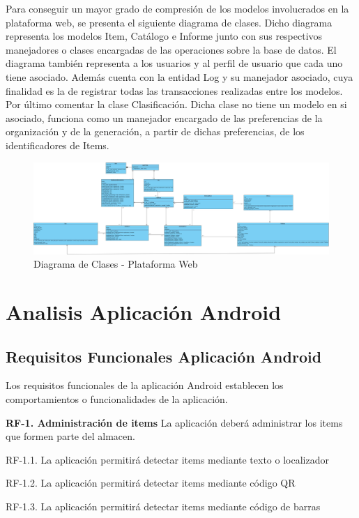 \documentclass[a4paper,11pt]{book}
\begin{document}
Para conseguir un mayor grado de compresión de los modelos involucrados en la plataforma web, se presenta el siguiente diagrama de clases. Dicho diagrama representa los modelos Item, Catálogo e Informe junto con sus respectivos manejadores o clases encargadas de las operaciones sobre la base de datos. El diagrama también representa a los usuarios y al perfil de usuario que cada uno tiene asociado.  Además cuenta con la entidad Log y su manejador asociado, cuya finalidad es la de registrar todas las transacciones realizadas entre los modelos. Por último comentar la clase Clasificación. Dicha clase no tiene un modelo en si asociado, funciona como un manejador encargado de las preferencias de la organización y de la generación, a partir de dichas preferencias, de los identificadores de Items. 

\begin{figure}[H] 
\centering 
\includegraphics[scale=0.15]{imagenes/clases/NoInventory_clases_web.jpg}
\caption{ Diagrama de Clases - Plataforma Web\cite{propio}  }  
\end{figure}


\section{Analisis Aplicación Android}

\subsection{Requisitos Funcionales Aplicación Android}
Los requisitos funcionales de la aplicación Android establecen los comportamientos o funcionalidades de la aplicación.

\textbf{RF-1. Administración de items} La aplicación deberá administrar los items que formen parte del almacen.   

RF-1.1. La aplicación permitirá detectar items mediante texto o localizador
	
RF-1.2. La aplicación permitirá detectar items mediante código QR
	
RF-1.3. La aplicación permitirá detectar items mediante código de barras
	
\end{document}
